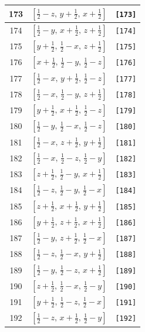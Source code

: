 \documentclass[fleqn,8pt]{jsarticle}
\begin{document}
\begin{longtable}{ccc}
173 & $\left[ \frac{1}{2} - z,\, y + \frac{1}{2},\, x + \frac{1}{2} \right]$ & {\tt [173]} \\ \hline
174 & $\left[ \frac{1}{2} - y,\, x + \frac{1}{2},\, z + \frac{1}{2} \right]$ & {\tt [174]} \\ \hline
175 & $\left[ y + \frac{1}{2},\, \frac{1}{2} - x,\, z + \frac{1}{2} \right]$ & {\tt [175]} \\ \hline
176 & $\left[ x + \frac{1}{2},\, \frac{1}{2} - y,\, \frac{1}{2} - z \right]$ & {\tt [176]} \\ \hline
177 & $\left[ \frac{1}{2} - x,\, y + \frac{1}{2},\, \frac{1}{2} - z \right]$ & {\tt [177]} \\ \hline
178 & $\left[ \frac{1}{2} - x,\, \frac{1}{2} - y,\, z + \frac{1}{2} \right]$ & {\tt [178]} \\ \hline
179 & $\left[ y + \frac{1}{2},\, x + \frac{1}{2},\, \frac{1}{2} - z \right]$ & {\tt [179]} \\ \hline
180 & $\left[ \frac{1}{2} - y,\, \frac{1}{2} - x,\, \frac{1}{2} - z \right]$ & {\tt [180]} \\ \hline
181 & $\left[ \frac{1}{2} - x,\, z + \frac{1}{2},\, y + \frac{1}{2} \right]$ & {\tt [181]} \\ \hline
182 & $\left[ \frac{1}{2} - x,\, \frac{1}{2} - z,\, \frac{1}{2} - y \right]$ & {\tt [182]} \\ \hline
183 & $\left[ z + \frac{1}{2},\, \frac{1}{2} - y,\, x + \frac{1}{2} \right]$ & {\tt [183]} \\ \hline
184 & $\left[ \frac{1}{2} - z,\, \frac{1}{2} - y,\, \frac{1}{2} - x \right]$ & {\tt [184]} \\ \hline
185 & $\left[ z + \frac{1}{2},\, x + \frac{1}{2},\, y + \frac{1}{2} \right]$ & {\tt [185]} \\ \hline
186 & $\left[ y + \frac{1}{2},\, z + \frac{1}{2},\, x + \frac{1}{2} \right]$ & {\tt [186]} \\ \hline
187 & $\left[ \frac{1}{2} - y,\, z + \frac{1}{2},\, \frac{1}{2} - x \right]$ & {\tt [187]} \\ \hline
188 & $\left[ \frac{1}{2} - z,\, \frac{1}{2} - x,\, y + \frac{1}{2} \right]$ & {\tt [188]} \\ \hline
189 & $\left[ \frac{1}{2} - y,\, \frac{1}{2} - z,\, x + \frac{1}{2} \right]$ & {\tt [189]} \\ \hline
190 & $\left[ z + \frac{1}{2},\, \frac{1}{2} - x,\, \frac{1}{2} - y \right]$ & {\tt [190]} \\ \hline
191 & $\left[ y + \frac{1}{2},\, \frac{1}{2} - z,\, \frac{1}{2} - x \right]$ & {\tt [191]} \\ \hline
192 & $\left[ \frac{1}{2} - z,\, x + \frac{1}{2},\, \frac{1}{2} - y \right]$ & {\tt [192]} \\
\end{longtable}
\end{document}
